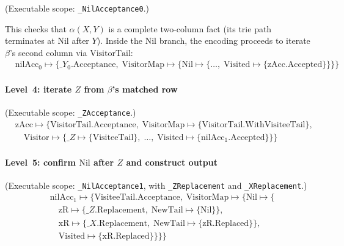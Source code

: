 (Executable scope: \texttt{\_NilAcceptance0}.)

This checks that $\alpha(X, Y)$ is a complete two-column
fact (its trie path terminates at $\mathrm{Nil}$ after $Y$).
Inside the $\mathrm{Nil}$ branch, the encoding proceeds to
iterate $\beta$'s second column via $\mathrm{VisitorTail}$:
{\small
  \begin{align*}
    &\mathrm{nilAcc}_0 \mapsto \{
      \_Y_0.\mathrm{Acceptance},\;
      \mathrm{VisitorMap} \mapsto \{
        \mathrm{Nil} \mapsto \{\ldots,\;
    \mathrm{Visited} \mapsto \{\mathrm{zAcc}.\mathrm{Accepted}\}\}\}\}
\end{align*}}

\paragraph{Level~4: iterate $Z$ from $\beta$'s matched row}
(Executable scope: \texttt{\_ZAcceptance}.)
{\small
  \begin{align*}
    &\mathrm{zAcc} \mapsto \{
      \mathrm{VisitorTail}.\mathrm{Acceptance},\;
      \mathrm{VisitorMap} \mapsto \{
      \mathrm{VisitorTail}.\mathrm{WithVisiteeTail}\},\\
      &\quad \mathrm{Visitor} \mapsto \{
        \_Z \mapsto \{\mathrm{VisiteeTail}\},\;
        \ldots,\;
    \mathrm{Visited} \mapsto \{\mathrm{nilAcc}_1.\mathrm{Accepted}\}\}\}
\end{align*}}

\paragraph{Level~5: confirm $\mathrm{Nil}$ after $Z$ and construct output}
(Executable scope: \texttt{\_NilAcceptance1}, with
\texttt{\_ZReplacement} and \texttt{\_XReplacement}.)
{\small
  \begin{align*}
    &\mathrm{nilAcc}_1 \mapsto \{
      \mathrm{VisiteeTail}.\mathrm{Acceptance},\;
      \mathrm{VisitorMap} \mapsto \{
        \mathrm{Nil} \mapsto \{\\
          &\quad
          \mathrm{zR} \mapsto \{\_Z.\mathrm{Replacement},\;
          \mathrm{NewTail} \mapsto \{\mathrm{Nil}\}\},\\
          &\quad
          \mathrm{xR} \mapsto \{\_X.\mathrm{Replacement},\;
          \mathrm{NewTail} \mapsto \{\mathrm{zR}.\mathrm{Replaced}\}\},\\
          &\quad
    \mathrm{Visited} \mapsto \{\mathrm{xR}.\mathrm{Replaced}\}\}\}\}
\end{align*}}

